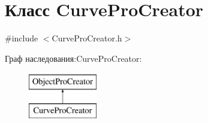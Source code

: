 \hypertarget{classCurveProCreator}{\section{Класс \-Curve\-Pro\-Creator}
\label{classCurveProCreator}
}


{\ttfamily \#include $<$\-Curve\-Pro\-Creator.\-h$>$}

Граф наследования\-:\-Curve\-Pro\-Creator\-:\begin{figure}[H]
\begin{center}
\leavevmode
\includegraphics[height=2.000000cm]{classCurveProCreator}
\end{center}
\end{figure}
